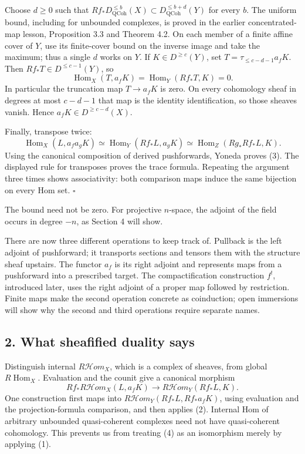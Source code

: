 \documentclass[11pt]{article}
\begin{document}
Choose \(d\geq0\) such that
\(Rf_*D^{\leq b}_{\mathrm{QCoh}}(X)\subset D^{\leq b+d}_{\mathrm{QCoh}}(Y)\)
for every \(b\). The uniform bound, including for unbounded complexes,
is proved in the earlier concentrated-map lesson, Proposition 3.3 and
Theorem 4.2. On each member of a finite affine cover of \(Y\), use its
finite-cover bound on the inverse image and take the maximum; thus a
single \(d\) works on \(Y\). If \(K\in D^{\geq c}(Y)\), set
\(T=\tau_{\leq c-d-1}a_fK\). Then \(Rf_*T\in D^{\leq c-1}(Y)\), so \[
\operatorname{Hom}_X(T,a_fK)=\operatorname{Hom}_Y(Rf_*T,K)=0.
\] In particular the truncation map \(T\to a_fK\) is zero. On every
cohomology sheaf in degrees at most \(c-d-1\) that map is the identity
identification, so those sheaves vanish. Hence
\(a_fK\in D^{\geq c-d}(X)\).

Finally, transpose twice: \[
\operatorname{Hom}_X(L,a_fa_gK)
 \simeq\operatorname{Hom}_Y(Rf_*L,a_gK)
 \simeq\operatorname{Hom}_Z(Rg_*Rf_*L,K).
\] Using the canonical composition of derived pushforwards, Yoneda
proves (3). The displayed rule for transposes proves the trace formula.
Repeating the argument three times shows associativity: both comparison
maps induce the same bijection on every Hom set. \(\square\)

The bound need not be zero. For projective \(n\)-space, the adjoint of
the field occurs in degree \(-n\), as Section 4 will show.

There are now three different operations to keep track of. Pullback is
the left adjoint of pushforward; it transports sections and tensors them
with the structure sheaf upstairs. The functor \(a_f\) is its right
adjoint and represents maps from a pushforward into a prescribed target.
The compactification construction \(f^!\), introduced later, uses the
right adjoint of a proper map followed by restriction. Finite maps make
the second operation concrete as coinduction; open immersions will show
why the second and third operations require separate names.

\subsection{2. What sheafified duality
says}\label{what-sheafified-duality-says}

Distinguish internal \(R\mathcal H om_X\), which is a complex of
sheaves, from global \(R\operatorname{Hom}_X\). Evaluation and the
counit give a canonical morphism \[
Rf_*R\mathcal H om_X(L,a_fK)
 \longrightarrow R\mathcal H om_Y(Rf_*L,K).
\tag{4}
\] One construction first maps into
\(R\mathcal H om_Y(Rf_*L,Rf_*a_fK)\), using evaluation and the
projection-formula comparison, and then applies (2). Internal Hom of
arbitrary unbounded quasi-coherent complexes need not have
quasi-coherent cohomology. This prevents us from treating (4) as an
isomorphism merely by applying (1).
\end{document}
